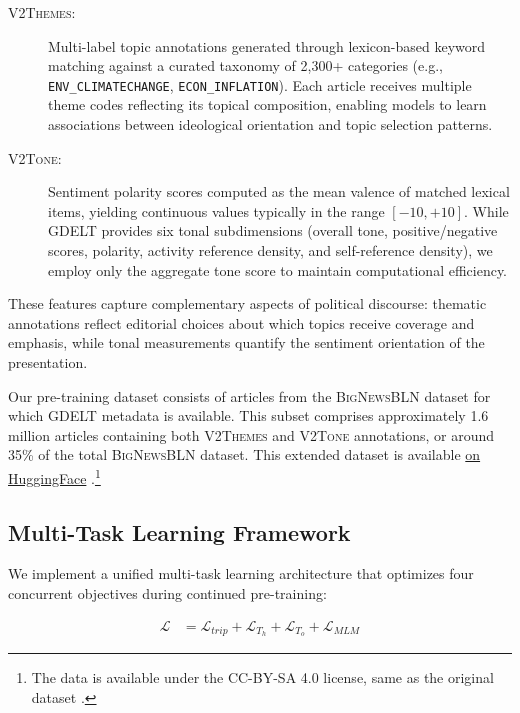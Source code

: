 \begin{description}
    \item[\textsc{V2Themes}:] Multi-label topic annotations generated through lexicon-based keyword matching against a curated taxonomy of 2,300+ categories (e.g., \texttt{ENV\_CLIMATECHANGE}, \texttt{ECON\_INFLATION}). Each article receives multiple theme codes reflecting its topical composition, enabling models to learn associations between ideological orientation and topic selection patterns.
    
    \item[\textsc{V2Tone}:] Sentiment polarity scores computed as the mean valence of matched lexical items, yielding continuous values typically in the range $[-10, +10]$. While GDELT provides six tonal subdimensions (overall tone, positive/negative scores, polarity, activity reference density, and self-reference density), we employ only the aggregate tone score to maintain computational efficiency.
\end{description}

These features capture complementary aspects of political discourse: thematic annotations reflect editorial choices about which topics receive coverage and emphasis, while tonal measurements quantify the sentiment orientation of the presentation.

Our pre-training dataset consists of articles from the \textsc{BigNewsBLN} dataset \citep{liu2022politics} for which GDELT metadata is available. This subset comprises approximately 1.6 million articles containing both \textsc{V2Themes} and \textsc{V2Tone} annotations, or around 35\% of the total \textsc{BigNewsBLN} dataset. This extended dataset is available 
\href{https://huggingface.co/datasets/dragonslayer631/bignewsalign-with-gdelt}{on HuggingFace} 
.\footnote{The data is available under the CC-BY-SA 4.0 license, same as the original dataset \citep{liu2022politics}.}

\subsection{Multi-Task Learning Framework}
\label{sec:multitask-framework}

We implement a unified multi-task learning architecture that optimizes four concurrent objectives during continued pre-training:

\begin{align}
\mathcal{L} &=  \mathcal{L}_{trip} + \mathcal{L}_{T_h} + \mathcal{L}_{T_o} + \mathcal{L}_{MLM} \label{eq:total-loss}
\end{align}

